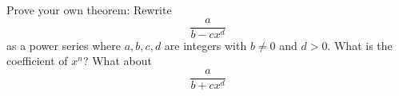   Prove your own theorem:
  Rewrite
  \[
    \frac{a}{b - cx^d}
  \]
  as a power series where $a,b,c,d$ are integers
  with $b \neq 0$ and $d > 0$. 
  What is the coefficient of $x^n$?
  What about
  \[
    \frac{a}{b + cx^d}
  \]
